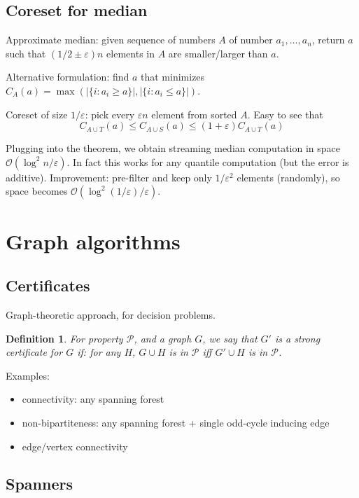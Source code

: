 \documentclass[11pt]{article}
\newtheorem{definition}[theorem]{Definition}
\newcommand{\bigo}{\mathcal{O}}
\begin{document}
\subsection{Coreset for median}
Approximate median: given sequence of numbers $A$ of number $a_1,\ldots,a_n$, return $a$ such that $(1/2 \pm \varepsilon)n$ elements in $A$ are smaller/larger than $a$.

Alternative formulation: find $a$ that minimizes $C_A(a) = \max( |\{i : a_i \ge a\}|, |\{i : a_i \le a\}| )$.

Coreset of size $1/\varepsilon$: pick every $\varepsilon n$ element from sorted $A$.
Easy to see that
$$C_{A \cup T}(a) \le C_{A \cup S}(a) \le (1+\varepsilon) C_{A \cup T}(a)$$

Plugging into the theorem, we obtain streaming median computation in space $\bigo(\log^2 n / \varepsilon)$. In fact this works for any quantile computation (but the error is additive). Improvement: pre-filter and keep only $1/\varepsilon^2$ elements (randomly), so space becomes $\bigo(\log^2 (1/\varepsilon) / \varepsilon)$.

\section{Graph algorithms}
\subsection{Certificates}
Graph-theoretic approach, for decision problems.

\begin{definition}
For property $\mathcal{P}$, and a graph $G$, we say that $G'$ is a strong certificate for $G$ if: for any $H$, $G\cup H$ is in $\mathcal{P}$ iff $G' \cup H$ is in $\mathcal{P}$.
\end{definition}

Examples:
\begin{itemize}
\item connectivity: any spanning forest
\item non-bipartiteness: any spanning forest + single odd-cycle inducing edge
\item edge/vertex connectivity
\end{itemize}

\subsection{Spanners \cite{DBLP:journals/dcg/AlthoferDDJS93}}
\end{document}

